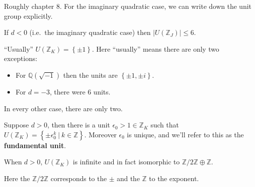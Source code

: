\begin{remark}

Roughly chapter 8. For the imaginary quadratic case, we can write down
the unit group explicitly.

\end{remark}

\begin{proposition}

If \(d<0\) (i.e.~the imaginary quadratic case) then
\({\left\lvert { U({\mathbb{Z}}_J)} \right\rvert} \leq 6\).

\end{proposition}

\begin{remark}

``Usually'' \(U({\mathbb{Z}}_K) = \left\{{ \pm 1 }\right\}\). Here
``usually'' means there are only two exceptions:

\begin{itemize}
\item
  For \({\mathbb{Q}}( \sqrt{-1} )\) then the units are
  \(\left\{{ \pm 1, \pm i }\right\}\).
\item
  For \(d=-3\), there were 6 units.
\end{itemize}

In every other case, there are only two.

\end{remark}

\begin{proposition}

Suppose \(d>0\), then there is a unit
\(\epsilon_0 > 1 \in {\mathbb{Z}}_K\) such that
\(U({\mathbb{Z}}_K) = \left\{{ \pm \epsilon_0 ^k {~\mathrel{\Big|}~}k\in {\mathbb{Z}}}\right\}\).
Moreover \(\epsilon_0\) is unique, and we'll refer to this as the
\textbf{fundamental unit}.

\end{proposition}

\begin{corollary}

When \(d>0\), \(U({\mathbb{Z}}_K)\) is infinite and in fact isomorphic
to \({\mathbb{Z}}/2{\mathbb{Z}}\oplus {\mathbb{Z}}\).

\end{corollary}

\begin{remark}

Here the \({\mathbb{Z}}/2{\mathbb{Z}}\) corresponds to the \(\pm\) and
the \({\mathbb{Z}}\) to the exponent.

\end{remark}

